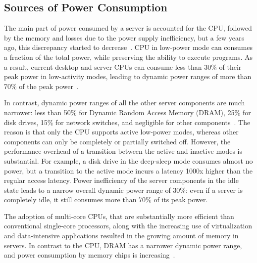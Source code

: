\documentclass[runningheads,a4paper]{llncs}
\begin{document}
\subsection{Sources of Power Consumption}

The main part of power consumed by a server is accounted for the CPU, followed by the memory and losses due to the power supply inefficiency, but a few years ago, this discrepancy started to decrease~\cite{Nathuji}. CPU in low-power mode can consumes a fraction of the total power, while preserving the ability to execute programs. As a result, current desktop and server CPUs can consume less than 30\% of their peak power in low-activity modes, leading to dynamic power ranges of more than 70\% of the peak power~\cite{barroso}.



In contrast, dynamic power ranges of all the other server components are much narrower: less than 50\% for Dynamic Random Access Memory (DRAM), 25\% for disk drives, 15\% for network switches, and negligible for other components~\cite{fan2007power}. The reason is that only the CPU supports active low-power modes, whereas other components can only be completely or partially switched off. However, the performance overhead of a transition between the active and inactive modes is substantial. For example, a disk drive in the deep-sleep mode consumes almost no power, but a transition to the active mode incurs a latency 1000x  higher than the regular access latency. Power inefficiency of the server components in the idle state leads to a narrow overall dynamic power range of 30\%: even if a server is completely idle, it still consumes more than 70\% of its peak power.

The adoption of multi-core CPUs, that are substantially more efficient than conventional single-core processors, along with the increasing use of virtualization and data-intensive applications resulted in the growing amount of memory in servers. In contrast to the CPU, DRAM has a narrower dynamic power range, and power consumption by memory chips is increasing~\cite{beloglazov2013energy}.
\end{document}
